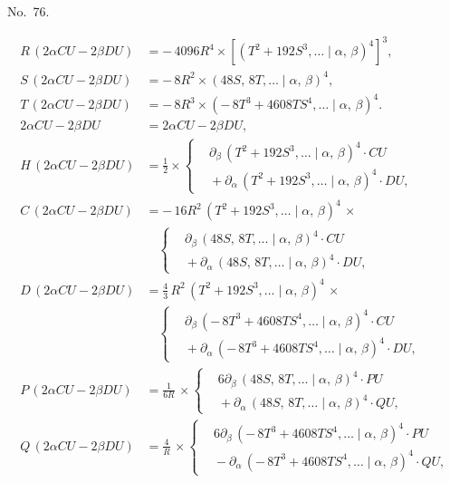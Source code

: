 \documentclass[11pt]{article}
\newcommand{\Cdel}{\mid}
\begin{document}
\begin{center}No.~76.\end{center}
\[
\begin{aligned}
   R\,(2\alpha C U - 2\beta D U) &= -\,4096 R^4\times[(T^2 + 192 S^3,\ldots\Cdel\alpha,\,\beta)^4]^3,\\
   S\,(2\alpha C U - 2\beta D U) &= -\,8 R^2\times(48 S,\,8 T,\ldots\Cdel\alpha,\,\beta)^4,\\
   T\,(2\alpha C U - 2\beta D U) &= -\,8 R^3\times(-\,8 T^3 + 4608 T S^4,\ldots\Cdel\alpha,\,\beta)^4.\\[6pt]
   2\alpha C U - 2\beta D U &= 2\alpha C U - 2\beta D U,\\
   H\,(2\alpha C U - 2\beta D U) &= \tfrac{1}{2}\times\left\{\begin{aligned}&\partial_\beta\,(T^2 + 192 S^3,\ldots\Cdel\alpha,\,\beta)^4\cdot C U\\ &{} + \partial_\alpha\,(T^2 + 192 S^3,\ldots\Cdel\alpha,\,\beta)^4\cdot D U,\end{aligned}\right.\\
   C\,(2\alpha C U - 2\beta D U) &= -\,16 R^2\,(T^2 + 192 S^3,\ldots\Cdel\alpha,\,\beta)^4\,\times\\
                                  &\quad\left\{\begin{aligned}&\partial_\beta\,(48 S,\,8 T,\ldots\Cdel\alpha,\,\beta)^4\cdot C U\\ &{} + \partial_\alpha\,(48 S,\,8 T,\ldots\Cdel\alpha,\,\beta)^4\cdot D U,\end{aligned}\right.\\
   D\,(2\alpha C U - 2\beta D U) &= \tfrac{4}{3}\,R^2\,(T^2 + 192 S^3,\ldots\Cdel\alpha,\,\beta)^4\,\times\\
                                  &\quad\left\{\begin{aligned}&\partial_\beta\,(-\,8 T^3 + 4608 T S^4,\ldots\Cdel\alpha,\,\beta)^4\cdot C U\\ &{} + \partial_\alpha\,(-\,8 T^3 + 4608 T S^4,\ldots\Cdel\alpha,\,\beta)^4\cdot D U,\end{aligned}\right.\\
   P\,(2\alpha C U - 2\beta D U) &= \tfrac{1}{6 R}\,\times\left\{\begin{aligned}&6\partial_\beta\,(48 S,\,8 T,\ldots\Cdel\alpha,\,\beta)^4\cdot P U\\ &{} + \partial_\alpha\,(48 S,\,8 T,\ldots\Cdel\alpha,\,\beta)^4\cdot Q U,\end{aligned}\right.\\
   Q\,(2\alpha C U - 2\beta D U) &= \tfrac{4}{R}\,\times\left\{\begin{aligned}&6\partial_\beta\,(-\,8 T^3 + 4608 T S^4,\ldots\Cdel\alpha,\,\beta)^4\cdot P U\\ &{} - \partial_\alpha\,(-\,8 T^3 + 4608 T S^4,\ldots\Cdel\alpha,\,\beta)^4\cdot Q U,\end{aligned}\right.\\

\end{aligned}\]
\end{document}
